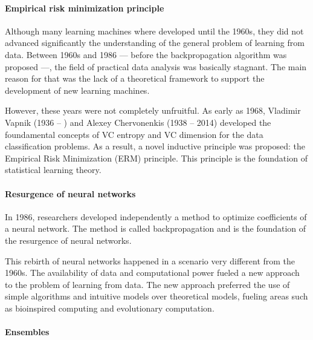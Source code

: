 \paragraph{Empirical risk minimization principle}

Although many learning machines where developed until the 1960s, they did not advanced
significantly the understanding of the general problem of learning from data.  Between
1960s and 1986 --- before the backpropagation algorithm was proposed ---, the field of practical
data analysis was basically stagnant.  The main reason for that was the lack of a
theoretical framework to support the development of new learning machines.

However, these years were not completely unfruitful.  As early as 1968, Vladimir Vapnik (1936 -- )
and Alexey Chervonenkis (1938 -- 2014) developed the foundamental concepts of VC entropy
and VC dimension for the data classification problems.  As a result, a novel inductive
principle was proposed: the Empirical Risk Minimization (ERM) principle.
This principle is the foundation of statistical learning theory.

%

\paragraph{Resurgence of neural networks}

In 1986, researchers developed independently a method to optimize coefficients of a neural
network.  The method is called backpropagation and
is the foundation of the resurgence of neural networks.

This rebirth of neural networks happened in a scenario very different from the 1960s.
The availability of data and computational power fueled a new approach to the problem of
learning from data.  The new approach preferred the use of simple algorithms and
intuitive models over theoretical models, fueling areas such as bioinspired computing and
evolutionary computation.

\paragraph{Ensembles}

